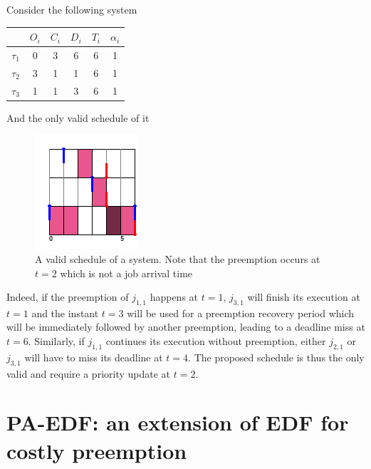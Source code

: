 \documentclass[a4paper,10pt]{article}
\begin{document}
        Consider the following system

        \begin{center}
            \begin{tabular}{|r|c|c|c|c|c|}
                \hline
                            & $O_i$ & $C_i$ & $D_i$ & $T_i$ & $\alpha_i$ \\ \hline
                $\tau_1$    & 0     & 3     & 6    & 6     & 1     \\ \hline
                $\tau_2$    & 3     & 1     & 1    & 6     & 1     \\ \hline
                $\tau_3$    & 1     & 1     & 3    & 6     & 1     \\ \hline
            \end{tabular}
        \end{center}

        And the only valid schedule of it

        \begin{figure}[H]
        \begin{center}
            \includegraphics[scale=0.7]{figs/mpana.png}
            \caption{A valid schedule of a system. Note that the preemption occurs at $t=2$ which is not a job arrival time}
            \label{fig:mpana}
        \end{center}
        \end{figure}

        Indeed, if the preemption of $j_{1,1}$ happens at $t=1$, $j_{3,1}$ will finish its execution at $t=1$ and the instant $t=3$ will be used for a preemption recovery period which will be immediately followed by another preemption, leading to a deadline miss at $t=6$. Similarly, if $j_{1,1}$ continues its execution without preemption, either $j_{2,1}$ or $j_{3,1}$ will have to miss its deadline at $t=4$. The proposed schedule is thus the only valid and require a priority update at $t=2$.

\section{PA-EDF: an extension of EDF for costly preemption}
\end{document}
